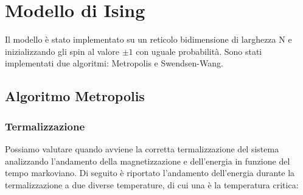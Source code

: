 






\section{Modello di Ising}
Il modello è stato implementato su un reticolo bidimensione di larghezza N e inizializzando gli spin al valore $\pm 1 $  con uguale probabilità.
Sono stati implementati due algoritmi: Metropolis e Swendsen-Wang.\\

\subsection{Algoritmo Metropolis}
\subsubsection{Termalizzazione}
Possiamo valutare quando avviene la corretta termalizzazione del sistema analizzando l'andamento della magnetizzazione e dell'energia in funzione del tempo markoviano.
Di seguito è riportato l'andamento dell'energia durante la termalizzazione a due diverse temperature, di cui una è la temperatura critica:\\
